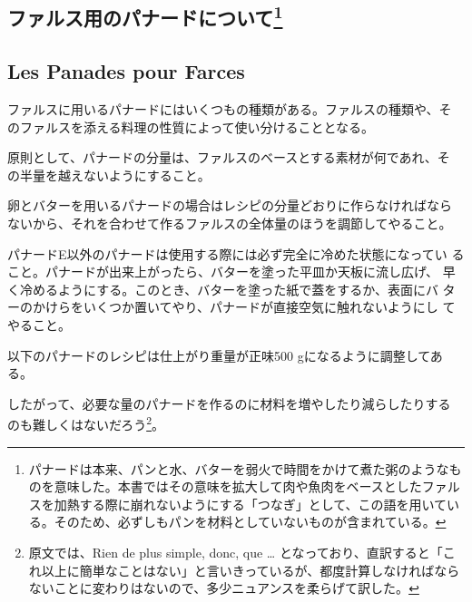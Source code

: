 \hypertarget{ux30d5ux30a1ux30ebux30b9ux7528ux306eux30d1ux30caux30fcux30c9ux306bux3064ux3044ux30666}{%
\subsection[ファルス用のパナードについて]{\texorpdfstring{ファルス用のパナードについて\footnote{パナードは本来、パンと水、バターを弱火で時間をかけて煮た粥のようなものを意味した。本書ではその意味を拡大して肉や魚肉をベースとしたファルスを加熱する際に崩れないようにする「つなぎ」として、この語を用いている。そのため、必ずしもパンを材料としていないものが含まれている。}}{ファルス用のパナードについて}}\label{ux30d5ux30a1ux30ebux30b9ux7528ux306eux30d1ux30caux30fcux30c9ux306bux3064ux3044ux30666}}

\vspace*{-1.7\zw}

\hypertarget{les-panades-pour-farces}{%
\subsection{Les Panades pour Farces}\label{les-panades-pour-farces}}


ファルスに用いるパナードにはいくつもの種類がある。ファルスの種類や、そ
のファルスを添える料理の性質によって使い分けることとなる。

原則として、パナードの分量は、ファルスのベースとする素材が何であれ、そ
の半量を越えないようにすること。

卵とバターを用いるパナードの場合はレシピの分量どおりに作らなければなら
ないから、それを合わせて作るファルスの全体量のほうを調節してやること。

パナードE以外のパナードは使用する際には必ず完全に冷めた状態になってい
ること。パナードが出来上がったら、バターを塗った平皿か天板に流し広げ、
早く冷めるようにする。このとき、バターを塗った紙で蓋をするか、表面にバ
ターのかけらをいくつか置いてやり、パナードが直接空気に触れないようにし
てやること。

以下のパナードのレシピは仕上がり重量が正味500
gになるように調整してある。

したがって、必要な量のパナードを作るのに材料を増やしたり減らしたりする
のも難しくはないだろう\footnote{原文では、Rien de plus simple, donc, que
  \ldots{}
  となっており、直訳すると「これ以上に簡単なことはない」と言いきっているが、都度計算しなければならないことに変わりはないので、多少ニュアンスを柔らげて訳した。}。

